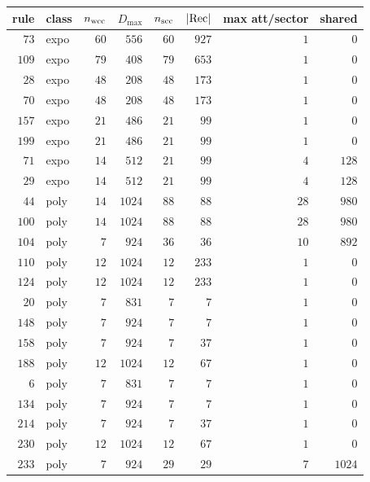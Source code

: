 \begin{tabular}{rlrrrrrr}
\hline
rule & class & $n_{\rm wcc}$ & $D_{\max}$ & $n_{\rm scc}$ & $|{\rm Rec}|$ & max att/sector & shared \\
\hline
$73$ & expo & $60$ & $556$ & $60$ & $927$ & $1$ & $0$ \\
$109$ & expo & $79$ & $408$ & $79$ & $653$ & $1$ & $0$ \\
$28$ & expo & $48$ & $208$ & $48$ & $173$ & $1$ & $0$ \\
$70$ & expo & $48$ & $208$ & $48$ & $173$ & $1$ & $0$ \\
$157$ & expo & $21$ & $486$ & $21$ & $99$ & $1$ & $0$ \\
$199$ & expo & $21$ & $486$ & $21$ & $99$ & $1$ & $0$ \\
$71$ & expo & $14$ & $512$ & $21$ & $99$ & $4$ & $128$ \\
$29$ & expo & $14$ & $512$ & $21$ & $99$ & $4$ & $128$ \\
$44$ & poly & $14$ & $1024$ & $88$ & $88$ & $28$ & $980$ \\
$100$ & poly & $14$ & $1024$ & $88$ & $88$ & $28$ & $980$ \\
$104$ & poly & $7$ & $924$ & $36$ & $36$ & $10$ & $892$ \\
$110$ & poly & $12$ & $1024$ & $12$ & $233$ & $1$ & $0$ \\
$124$ & poly & $12$ & $1024$ & $12$ & $233$ & $1$ & $0$ \\
$20$ & poly & $7$ & $831$ & $7$ & $7$ & $1$ & $0$ \\
$148$ & poly & $7$ & $924$ & $7$ & $7$ & $1$ & $0$ \\
$158$ & poly & $7$ & $924$ & $7$ & $37$ & $1$ & $0$ \\
$188$ & poly & $12$ & $1024$ & $12$ & $67$ & $1$ & $0$ \\
$6$ & poly & $7$ & $831$ & $7$ & $7$ & $1$ & $0$ \\
$134$ & poly & $7$ & $924$ & $7$ & $7$ & $1$ & $0$ \\
$214$ & poly & $7$ & $924$ & $7$ & $37$ & $1$ & $0$ \\
$230$ & poly & $12$ & $1024$ & $12$ & $67$ & $1$ & $0$ \\
$233$ & poly & $7$ & $924$ & $29$ & $29$ & $7$ & $1024$ \\
\hline
\end{tabular}
